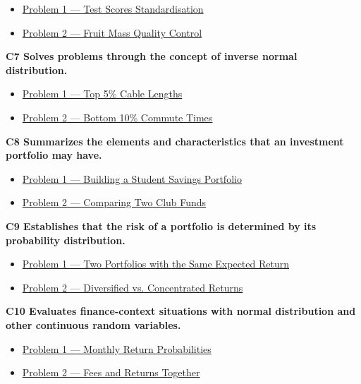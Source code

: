 	\begin{itemize}
		\item \hyperlink{c6-ex1}{Problem 1 — Test Scores Standardisation}
		\item \hyperlink{c6-ex2}{Problem 2 — Fruit Mass Quality Control}
	\end{itemize}
	\noindent\textbf{C7 Solves problems through the concept of inverse normal distribution.}
	\begin{itemize}
		\item \hyperlink{c7-ex1}{Problem 1 — Top 5\% Cable Lengths}
		\item \hyperlink{c7-ex2}{Problem 2 — Bottom 10\% Commute Times}
	\end{itemize}
	\noindent\textbf{C8 Summarizes the elements and characteristics that an investment portfolio may have.}
	\begin{itemize}
		\item \hyperlink{c8-ex1}{Problem 1 — Building a Student Savings Portfolio}
		\item \hyperlink{c8-ex2}{Problem 2 — Comparing Two Club Funds}
	\end{itemize}
	\noindent\textbf{C9 Establishes that the risk of a portfolio is determined by its probability distribution.}
	\begin{itemize}
		\item \hyperlink{c9-ex1}{Problem 1 — Two Portfolios with the Same Expected Return}
		\item \hyperlink{c9-ex2}{Problem 2 — Diversified vs. Concentrated Returns}
	\end{itemize}
	\noindent\textbf{C10 Evaluates finance-context situations with normal distribution and other continuous random variables.}
	\begin{itemize}
		\item \hyperlink{c10-ex1}{Problem 1 — Monthly Return Probabilities}
		\item \hyperlink{c10-ex2}{Problem 2 — Fees and Returns Together}
	\end{itemize}
	
	
